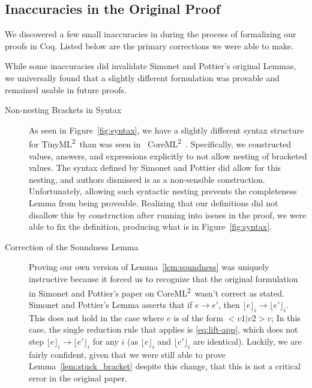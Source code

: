 \documentclass[a4paper,twocolumn]{article}
\newcommand{\langName}[0]{TinyML\textsuperscript{2}~}
\newcommand{\origLang}[0]{CoreML\textsuperscript{2}~}
\newcommand{\lift}[1]{\lfloor #1 \rfloor}
\theoremstyle{plain}
\theoremstyle{definition}
\begin{document}
\subsection{Inaccuracies in the Original Proof}

We discovered a few small inaccuracies in \cite{InfoFlowML} during the 
process of formalizing our proofs in Coq.  Listed below are the primary
corrections we were able to make.

While some inaccuracies did invalidate Simonet and Pottier's original
Lemmas, we universally found that a slightly different formulation was
provable and remained usable in future proofs.

\begin{description}
  \item[Non-nesting Brackets in Syntax]
    \hspace{0pt}
    
    As seen in Figure~\ref{fig:syntax}, we have a slightly different syntax
    structure for \langName than was seen in~ \origLang.  Specifically, we constructed
    values, answers, and expressions explicitly to not allow nesting of
    bracketed values.  The syntax defined by Simonet and Pottier did allow
    for this nesting, and authors dismissed is as a non-sensible
    construction.  Unfortunately, allowing such syntactic nesting 
    prevents the completeness Lemma from being proveable.
    Realizing that our definitions did not disallow
    this by construction after running into issues in the proof, we were able to
    fix the definition, producing what is in Figure~\ref{fig:syntax}.
    
  \item[Correction of the Soundness Lemma]
    \hspace{0pt}

    Proving our own version of Lemma~\ref{lem:soundness} was uniquely
    instructive because it forced us to recognize that the original
    formulation in Simonet and Pottier's paper on \origLang wasn't 
    correct as stated.  Simonet and Pottier's Lemma asserts that 
    if $e \rightarrow e'$, then $\lift{e}_i \rightarrow \lift{e'}_i$.
    This does not hold in the case where $e$ is of the form $<v1 | v2> v$;
    In this case, the single reduction rule that applies is \ref{eq:lift-app},
    which does not step $\lift{e}_i \rightarrow \lift{e'}_i$ for any $i$ 
    (as $\lift{e}_i$ and $\lift{e'}_i$ are identical).  Luckily, we are
    fairly confident, given that we were still able to prove
    Lemma~\ref{lem:stuck_bracket} despite this change, that this is not a
    critical error in the original paper.
\end{description}
\end{document}
